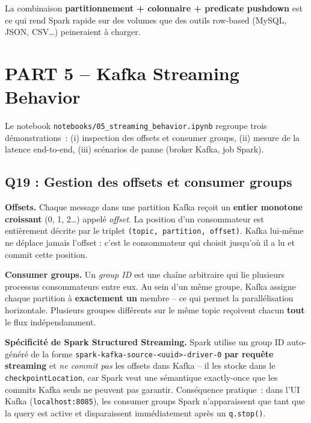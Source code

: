 \documentclass{RapportINPTCLOUD}
\begin{document}
La combinaison \textbf{partitionnement + colonnaire + predicate pushdown} est ce qui rend Spark rapide sur des volumes que des outils row-based (MySQL, JSON, CSV\dots) peineraient \`{a} charger.

\section{PART 5 -- Kafka Streaming Behavior}

Le notebook \texttt{notebooks/05\_streaming\_behavior.ipynb} regroupe trois d\'{e}monstrations~: (i) inspection des offsets et consumer groups, (ii) mesure de la latence end-to-end, (iii) sc\'{e}narios de panne (broker Kafka, job Spark).

\subsection{Q19 : Gestion des offsets et consumer groups}

\textbf{Offsets.} Chaque message dans une partition Kafka re\c{c}oit un \textbf{entier monotone croissant} (0, 1, 2\dots) appel\'{e} \textit{offset}. La position d'un consommateur est enti\`{e}rement d\'{e}crite par le triplet \texttt{(topic, partition, offset)}. Kafka lui-m\^{e}me ne d\'{e}place jamais l'offset : c'est le consommateur qui choisit jusqu'o\`{u} il a lu et \og commit\fg{} cette position.

\textbf{Consumer groups.} Un \textit{group ID} est une cha\^{i}ne arbitraire qui lie plusieurs processus consommateurs entre eux. Au sein d'un m\^{e}me groupe, Kafka assigne chaque partition \`{a} \textbf{exactement un} membre -- ce qui permet la parall\'{e}lisation horizontale. Plusieurs groupes diff\'{e}rents sur le m\^{e}me topic re\c{c}oivent chacun \textbf{tout} le flux ind\'{e}pendamment.

\textbf{Sp\'{e}cificit\'{e} de Spark Structured Streaming.} Spark utilise un group ID auto-g\'{e}n\'{e}r\'{e} de la forme \texttt{spark-kafka-source-<uuid>-driver-0} \textbf{par requ\^{e}te streaming} et \textit{ne commit pas} les offsets dans Kafka -- il les stocke dans le \texttt{checkpointLocation}, car Spark veut une s\'{e}mantique exactly-once que les commits Kafka seuls ne peuvent pas garantir. Cons\'{e}quence pratique~: dans l'UI Kafka (\texttt{localhost:8085}), les consumer groups Spark n'apparaissent que tant que la query est active et disparaissent imm\'{e}diatement apr\`{e}s un \texttt{q.stop()}.
\end{document}
